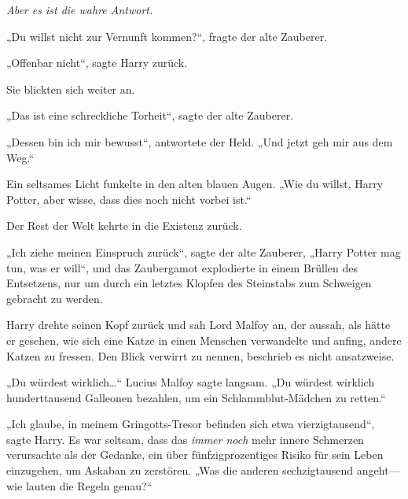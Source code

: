 \emph{Aber es ist die wahre Antwort.}

„Du willst nicht zur Vernunft kommen?“, fragte der alte Zauberer.

„Offenbar nicht“, sagte Harry zurück.

Sie blickten sich weiter an.

„Das ist eine schreckliche Torheit“, sagte der alte Zauberer.

„Dessen bin ich mir bewusst“, antwortete der Held.
„Und jetzt geh mir aus dem Weg.“

Ein seltsames Licht funkelte in den alten blauen Augen.
„Wie du willst, Harry Potter, aber wisse, dass dies noch nicht vorbei ist.“

Der Rest der Welt kehrte in die Existenz zurück.

„Ich ziehe meinen Einspruch zurück“, sagte der alte Zauberer,
„Harry Potter mag tun, was er will“, und das Zaubergamot explodierte in einem Brüllen des Entsetzens, nur um durch ein letztes Klopfen des Steinstabs zum Schweigen gebracht zu werden.

Harry drehte seinen Kopf zurück und sah Lord Malfoy an, der aussah, als hätte er gesehen, wie sich eine Katze in einen Menschen verwandelte und anfing, andere Katzen zu fressen. Den Blick verwirrt zu nennen, beschrieb es nicht ansatzweise.

„Du würdest wirklich…“ Lucius Malfoy sagte langsam.
„Du würdest wirklich hunderttausend Galleonen bezahlen, um ein Schlammblut-Mädchen zu retten.“

„Ich glaube, in meinem Gringotts-Tresor befinden sich etwa vierzigtausend“, sagte Harry. Es war seltsam, dass das \emph{immer noch} mehr innere Schmerzen verursachte als der Gedanke, ein über fünfzigprozentiges Risiko für sein Leben einzugehen, um Askaban zu zerstören.
„Was die anderen sechzigtausend angeht—wie lauten die Regeln genau?“


